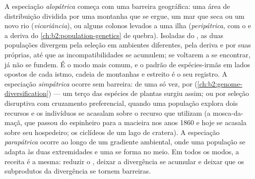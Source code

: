 \begin{proposition}\label{prop:b2:speciation:modes}
A especiação \emph{alopátrica} começa com uma barreira geográfica: uma
área de distribuição dividida por uma montanha que se ergue, um mar que
seca ou um novo rio (\emph{vicariância}), ou alguns colonos levados a
uma ilha (\emph{peripátrica}, com o  e a deriva do
\cref{ch:b2:population-genetics} de quebra). Isoladas do ,
as duas populações divergem pela seleção em ambientes diferentes, pela
deriva e por suas  próprias, até que as incompatibilidades se
acumulem; se voltarem a se encontrar, já não se fundem. É o modo mais
comum, e o padrão de espécies-irmãs em lados opostos de cada istmo,
cadeia de montanhas e estreito é o seu registro. A especiação
\emph{simpátrica} ocorre sem barreira: de uma só vez, por 
(\cref{ch:b2:genome-diversification}) --- um terço das espécies de
plantas surgiu assim; ou por seleção disruptiva com cruzamento
preferencial, quando uma população explora dois recursos e os
indivíduos se acasalam sobre o recurso que utilizam (a mosca-da-maçã,
que passou do espinheiro para a macieira nos anos 1860 e hoje se acasala
sobre seu hospedeiro; os ciclídeos de um lago de cratera). A especiação
\emph{parapátrica} ocorre ao longo de um gradiente ambiental, onde uma
população se adapta às duas extremidades e uma  se forma no
meio. Em todos os modos, a receita é a mesma: reduzir o ,
deixar a divergência se acumular e deixar que os subprodutos da
divergência se tornem barreiras.
\end{proposition}

